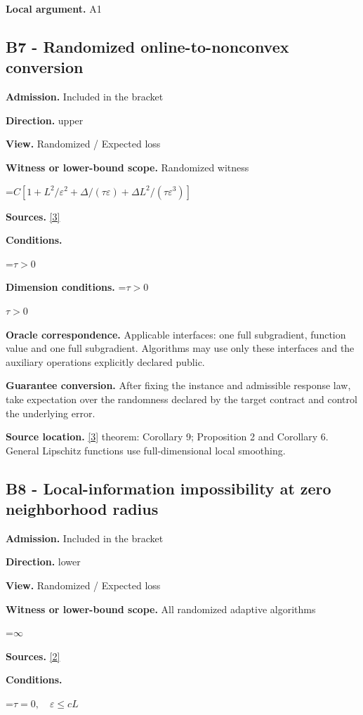 \documentclass[10pt,a4paper]{article}
\newcommand{\AtlasMath}[1]{\par\begingroup\centering\setbox0=\hbox{$\displaystyle #1$}\ifdim\wd0>1.4\linewidth\typeout{ATLAS WIDE FORMULA: \the\wd0}\fi\ifdim\wd0>\linewidth\resizebox{\linewidth}{!}{\box0}\else\box0\fi\par\endgroup}
\newcommand{\AtlasInlineMath}[1]{\begingroup\setbox0=\hbox{$#1$}\ifdim\wd0>.4\linewidth\endgroup\AtlasMath{#1}\else\endgroup$#1$\fi}
\begin{document}
\textbf{Local argument.} A1

\subsection{B7 - Randomized online-to-nonconvex conversion}
\textbf{Admission.} Included in the bracket

\textbf{Direction.} upper

\textbf{View.} Randomized / Expected loss

\textbf{Witness or lower-bound scope.} Randomized witness

\AtlasMath{C[1+L^2/\varepsilon^2+\Delta/(\tau\varepsilon)+\Delta L^2/(\tau\varepsilon^3)]}
\textbf{Sources.} \href{https://arxiv.org/pdf/2302.03775}{[3]}

\textbf{Conditions.} 
\AtlasMath{\tau>0}


\textbf{Dimension conditions.} \AtlasInlineMath{\tau>0}

\textbf{Oracle correspondence.} Applicable interfaces: one full subgradient, function value and one full subgradient. Algorithms may use only these interfaces and the auxiliary operations explicitly declared public.

\textbf{Guarantee conversion.} After fixing the instance and admissible response law, take expectation over the randomness declared by the target contract and control the underlying error.

\textbf{Source location.} \href{https://arxiv.org/pdf/2302.03775}{[3]} theorem: Corollary 9; Proposition 2 and Corollary 6. General Lipschitz functions use full-dimensional local smoothing.

\subsection{B8 - Local-information impossibility at zero neighborhood radius}
\textbf{Admission.} Included in the bracket

\textbf{Direction.} lower

\textbf{View.} Randomized / Expected loss

\textbf{Witness or lower-bound scope.} All randomized adaptive algorithms

\AtlasMath{\infty}
\textbf{Sources.} \href{https://www.jmlr.org/papers/volume23/21-1507/21-1507.pdf}{[2]}

\textbf{Conditions.} 
\AtlasMath{\tau=0,\quad\varepsilon\le cL}
\end{document}
